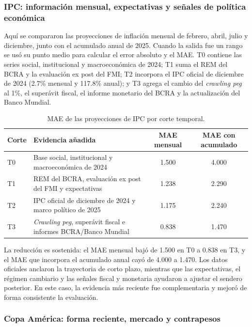 ﻿\documentclass{article}
\begin{document}
\subsubsection{IPC: información mensual, expectativas y señales de política económica}

Aquí se compararon las proyecciones de inflación mensual de febrero, abril, julio y diciembre, junto con el acumulado anual de 2025. Cuando la salida fue un rango se usó su punto medio para calcular el error absoluto y el MAE. T0 contiene las series social, institucional y macroeconómica de 2024; T1 suma el REM del BCRA y la evaluación ex post del FMI; T2 incorpora el IPC oficial de diciembre de 2024 (2.7\% mensual y 117.8\% anual); y T3 agrega el cambio del \textit{crawling peg} al 1\%, el superávit fiscal, el informe monetario del BCRA y la actualización del Banco Mundial.

\begin{table}[H]
    \centering
    \small
    \begin{tabular}{@{}lp{7.1cm}cc@{}}
        \toprule
        \textbf{Corte} & \textbf{Evidencia añadida} & \textbf{MAE mensual} & \textbf{MAE con acumulado} \\ \midrule
        T0 & Base social, institucional y macroeconómica de 2024 & 1.500 & 4.000 \\
        T1 & REM del BCRA, evaluación ex post del FMI y expectativas & 1.238 & 2.290 \\
        T2 & IPC oficial de diciembre de 2024 y marco político de 2025 & 1.175 & 2.240 \\
        T3 & \textit{Crawling peg}, superávit fiscal e informes BCRA/Banco Mundial & 0.838 & 1.470 \\ \bottomrule
    \end{tabular}
    \caption{MAE de las proyecciones de IPC por corte temporal.}
    \label{tab:seed_ipc}
\end{table}

La reducción es sostenida: el MAE mensual bajó de 1.500 en T0 a 0.838 en T3, y el MAE que incorpora el acumulado anual cayó de 4.000 a 1.470. Los datos oficiales anclaron la trayectoria de corto plazo, mientras que las expectativas, el régimen cambiario y las señales fiscal y monetaria ayudaron a ajustar el sendero posterior. En este caso, la evidencia más reciente fue complementaria y mejoró de forma consistente la evaluación.

\subsubsection{Copa América: forma reciente, mercado y contrapesos}
\end{document}
